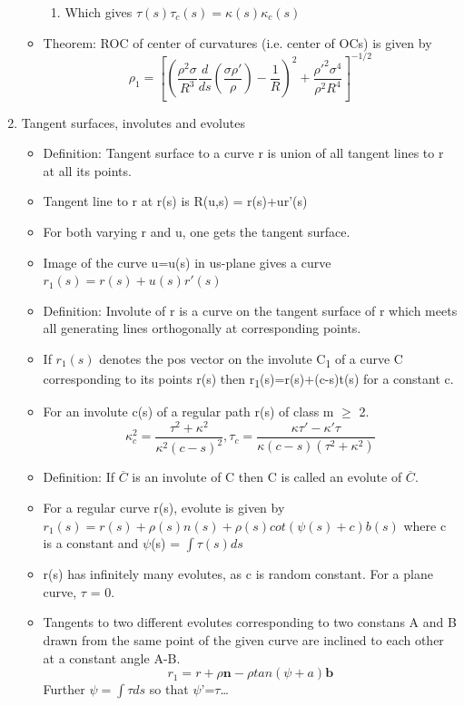 \documentclass[11pt]{article}
\begin{document}
\begin{enumerate}
\begin{itemize}
\begin{enumerate}
\item Which gives \(\tau(s)\tau_{c}(s)=\kappa(s)\kappa_{c}(s)\)
\end{enumerate}
\item Theorem: ROC of center of curvatures (i.e. center of OCs) is given by
\[
  \rho_{1} = [( \frac{\rho^{2}\sigma}{R^{3}}\frac{d}{ds}(\frac{\sigma\rho'}{\rho})-\frac{1}{R} )^{2} + \frac{\rho'^{2}\sigma^{4}}{\rho^{2}R^{4}}]^{-1/2}
  \]
\end{itemize}
\item Tangent surfaces, involutes and evolutes
\label{sec:org9374f1d}
\begin{itemize}
\item Definition: Tangent surface to a curve r is union of all tangent lines to r at all its points.
\item Tangent line to r at r(s) is R(u,s) = r(s)+ur'(s)
\item For both varying r and u, one gets the tangent surface.
\item Image of the curve u=u(s) in us-plane gives a curve \(r_{1}(s)=r(s)+u(s)r'(s)\)
\item Definition: Involute of r is a curve on the tangent surface of r which meets all generating lines orthogonally at corresponding points.
\item If \(r_{1}(s)\) denotes the pos vector on the involute C\textsubscript{1} of a curve C corresponding to its points r(s) then r\textsubscript{1}(s)=r(s)+(c-s)t(s) for a constant c.
\item For an involute c(s) of a regular path r(s) of class m \(\ge\) 2.
\[
    \kappa_{c}^2 = \frac{\tau^{2}+\kappa^{2}}{\kappa^{2}(c-s)^{2}}, \tau_c = \frac{\kappa\tau'-\kappa'\tau}{\kappa(c-s)(\tau^{2}+\kappa^{2})}
  \]

\item Definition: If \(\overline{C}\) is an involute of C then C is called an evolute of \(\overline{C}\).
\item For a regular curve r(s), evolute is given by \(r_{1}(s)=r(s)+\rho(s)n(s)+\rho(s)cot(\psi(s)+c)b(s)\) where c is a constant and \(\psi\)(s) = \(\int \tau(s)ds\)
\item r(s) has infinitely many evolutes, as c is random constant. For a plane curve, \(\tau\) = 0.
\item Tangents to two different evolutes corresponding to two constans A and B drawn from the same point of the given curve are inclined to each other at a constant angle A-B.
\[
    r_{1} = r+\rho\textbf{n}-\rho tan(\psi+a)\textbf{b}
  \]
Further \(\psi = \int \tau ds\) so that \(\psi\)'=\(\tau\)\ldots{}
\end{itemize}
\end{enumerate}
\end{document}
